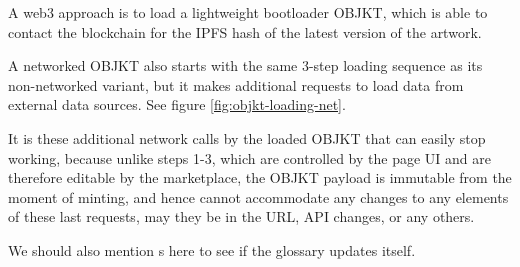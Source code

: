 A web3 approach is to load a lightweight bootloader OBJKT, which is able to contact the blockchain for the IPFS hash of the latest version of the artwork.



A networked OBJKT also starts with the same 3-step loading sequence as its non-networked variant, but it makes additional requests to load data from external data sources. See figure \ref{fig:objkt-loading-net}.



It is these additional network calls by the loaded OBJKT that can easily stop working, because unlike steps 1-3, which are controlled by the page UI and are therefore editable by the marketplace, the OBJKT payload is immutable from the moment of minting, and hence cannot accommodate any changes to any elements of these last requests, may they be in the URL, API changes, or any others.

We should also mention s here to see if the glossary updates itself.







